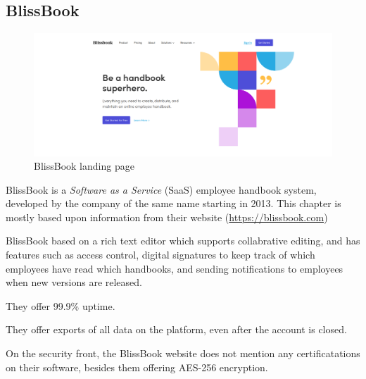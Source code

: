\subsection{BlissBook}
\begin{figure}[h]
	\includegraphics[width=1\textwidth]{billeder/BlissBooks.png}
	\caption{BlissBook landing page}
\end{figure}
BlissBook is a \textit{Software as a Service} (SaaS) employee handbook system, developed by the company of the same name starting in 2013. %
This chapter is mostly based upon information from their website (\url{https://blissbook.com})


BlissBook based on a rich text editor which supports collabrative editing, and has features such as access control, digital signatures to keep track of which employees have read which handbooks, and sending notifications to employees when new versions are released.

They offer 99.9\% uptime.

They offer exports of all data on the platform, even after the account is closed.

On the security front, the BlissBook website does not mention any certificatations on their software, besides them offering AES-256 encryption. %
